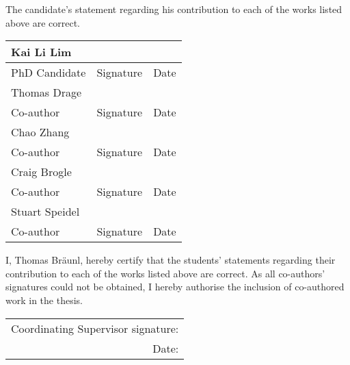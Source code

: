 \pagebreak

\noindent The candidate's statement regarding his contribution to each of the works listed above are correct.
\vspace{8ex}

\begin{table}[h]
	\centering
	\renewcommand{\arraystretch}{.1} %
	\floatsep -10cm
	\begin{tabular}{p{}p{}p{}}
		Kai Li Lim & \centering  & \multicolumn{1}{r}{} \\ \midrule
		PhD Candidate     & \multicolumn{1}{c}{Signature} & \multicolumn{1}{r}{Date} \\[8ex]
		Thomas Drage & \centering  & \multicolumn{1}{r}{} \\ \midrule
		Co-author     & \multicolumn{1}{c}{Signature} & \multicolumn{1}{r}{Date} \\[8ex]
		Chao Zhang & \centering  & \multicolumn{1}{r}{} \\ \midrule
		Co-author     & \multicolumn{1}{c}{Signature} & \multicolumn{1}{r}{Date} \\[8ex]  
		Craig Brogle &\centering  & \multicolumn{1}{r}{} \\ \midrule
		Co-author     & \multicolumn{1}{c}{Signature} & \multicolumn{1}{r}{Date} \\[8ex]
		Stuart Speidel & \centering  & \multicolumn{1}{r}{} \\ \midrule
		Co-author     & \multicolumn{1}{c}{Signature} & \multicolumn{1}{r}{Date} \\
	\end{tabular}
\end{table}

\vspace{8ex}

\noindent I, Thomas Bräunl, hereby certify that the students' statements regarding their contribution to each of the works listed above are correct. As all co-authors' signatures could not be obtained, I hereby authorise the inclusion of co-authored work in the thesis.

\vspace{8ex}

\begin{table}[h]
	\flushleft
	\begin{tabular}{r}
		Coordinating Supervisor signature: \\
		Date:\\
	\end{tabular}
\end{table}

